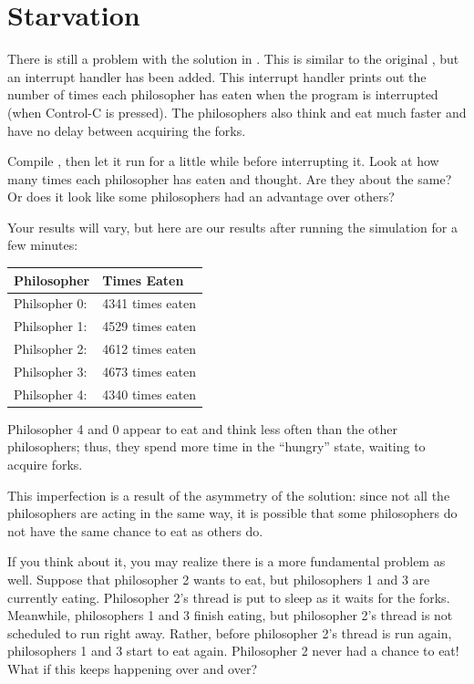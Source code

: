\documentclass[letterpaper,10pt,openany,oneside]{sphinxmanual}
\begin{document}
\section{Starvation}
\label{SharedMemory/SharedMemory:starvation}
There is still a problem with the solution in . This is
similar to the original , but an interrupt
handler has been added. This interrupt handler prints out the
number of times each philosopher has eaten when the program is
interrupted (when Control-C is pressed). The philosophers also
think and eat much faster and have no delay between acquiring the
forks.

Compile , then let it run for a little
while before interrupting it. Look at how many times each
philosopher has eaten and thought. Are they about the same? Or does
it look like some philosophers had an advantage over others?

Your results will vary, but here are our results after running the
simulation for a few minutes:

\begin{tabulary}{\linewidth}{|L|L|}
\hline
\textbf{
Philosopher
} & \textbf{
Times Eaten
}\\\hline

Philsopher 0:
 & 
4341 times eaten
\\\hline

Philsopher 1:
 & 
4529 times eaten
\\\hline

Philsopher 2:
 & 
4612 times eaten
\\\hline

Philsopher 3:
 & 
4673 times eaten
\\\hline

Philsopher 4:
 & 
4340 times eaten
\\\hline
\end{tabulary}


Philosopher 4 and 0 appear to eat and think less often than the
other philosophers; thus, they spend more time in the ``hungry''
state, waiting to acquire forks.

This imperfection is a result of the asymmetry of the solution:
since not all the philosophers are acting in the same way, it is
possible that some philosophers do not have the same chance to eat
as others do.

If you think about it, you may realize there is a more fundamental
problem as well. Suppose that philosopher 2 wants to eat, but
philosophers 1 and 3 are currently eating. Philosopher 2's thread
is put to sleep as it waits for the forks. Meanwhile, philosophers
1 and 3 finish eating, but philosopher 2's thread is not scheduled
to run right away. Rather, before philosopher 2's thread is run
again, philosophers 1 and 3 start to eat again. Philosopher 2 never
had a chance to eat! What if this keeps happening over and over?
\end{document}
